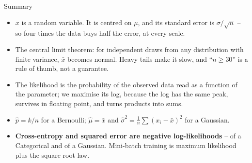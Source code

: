 \begin{frame}{Summary}
\begin{itemize}
  \item $\bar{x}$ is a random variable. It is centred on $\mu$, and its standard error is $\sigma/\sqrt{n}$ -- so four times the data buys half the error, at every scale.
  \pause
  \item The central limit theorem: for independent draws from any distribution with finite variance, $\bar{x}$ becomes normal. Heavy tails make it slow, and ``$n \ge 30$'' is a rule of thumb, not a guarantee.
  \pause
  \item The likelihood is the probability of the observed data read as a function of the parameter; we maximise its log, because the log has the same peak, survives in floating point, and turns products into sums.
  \pause
  \item $\hat{p} = k/n$ for a Bernoulli; $\hat{\mu} = \bar{x}$ and $\hat{\sigma}^2 = \tfrac{1}{n}\sum(x_i - \bar{x})^2$ for a Gaussian.
  \pause
  \item \textbf{Cross-entropy and squared error are negative log-likelihoods} -- of a Categorical and of a Gaussian. Mini-batch training is maximum likelihood plus the square-root law.
\end{itemize}
\end{frame}
